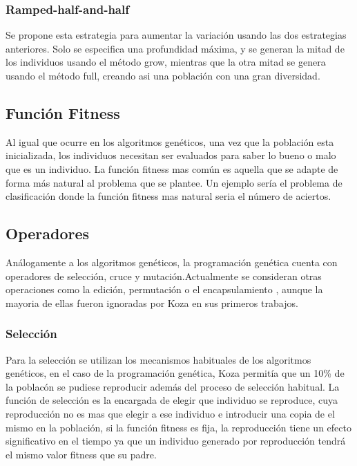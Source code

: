\documentclass[12pt]{article} \usepackage[utf8x]{inputenc}
\begin{document}
\subsubsection{Ramped-half-and-half}
 
Se propone esta estrategia para aumentar la variación usando las dos
estrategias anteriores. Solo se especifica una profundidad máxima, y
se generan la mitad de los individuos usando el método grow, mientras
que la otra mitad se genera usando el método full, creando asi una
población con una gran diversidad.
 
\subsection{Función Fitness}
 
Al igual que ocurre en los algoritmos genéticos, una vez que la
población esta inicializada, los individuos necesitan ser evaluados
para saber lo bueno o malo que es un individuo. La función fitness mas
común es aquella que se adapte de forma más natural al problema que se
plantee. Un ejemplo sería el problema de clasificación donde la
función fitness mas natural seria el número de aciertos.
 
\subsection{Operadores}
 
Análogamente a los algoritmos genéticos, la programación genética
cuenta con operadores de selección, cruce y mutación.Actualmente se
consideran otras operaciones como la edición, permutación o el
encapsulamiento , aunque la mayoria de ellas fueron ignoradas por Koza
en sus primeros trabajos.
 
\subsubsection{Selección}
 
Para la selección se utilizan los mecanismos habituales de los
algoritmos genéticos, en el caso de la programación genética, Koza
permitía que un 10\% de la poblacón se pudiese reproducir además del
proceso de selección habitual. La función de selección es la encargada
de elegir que individuo se reproduce, cuya reproducción no es mas que
elegir a ese individuo e introducir una copia de el mismo en la
población, si la función fitness es fija, la reproducción tiene un
efecto significativo en el tiempo ya que un individuo generado por
reproducción tendrá el mismo valor fitness que su padre.
 
\end{document}
